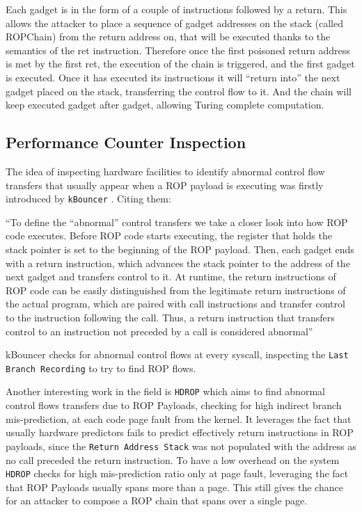 \documentclass[11pt]{article}
\begin{document}
Each gadget is in the form of a couple of instructions followed by a return. This allows the attacker to place a sequence of gadget addresses on the stack (called ROPChain) from the return address on, that will be executed thanks to the semantics of the ret instruction. Therefore once the first poisoned return address is met by the first ret, the execution of the chain is triggered, and the first gadget is executed. Once it has executed its instructions it will ``return into'' the next gadget placed on the stack, transferring the control flow to it. And the chain will keep executed gadget after gadget, allowing Turing complete computation.

\subsection{Performance Counter Inspection}
The idea of inspecting hardware facilities to identify abnormal control flow transfers that usually appear when a ROP payload is executing was firstly introduced by {\tt kBouncer} \cite{kbouncer}. Citing them:

``To define the “abnormal” control transfers we take a closer look into how ROP code executes. Before
ROP code starts executing, the register that holds the stack pointer is set to the beginning of the ROP
payload. Then, each gadget ends with a return instruction, which advances the stack pointer to the address
of the next gadget and transfers control to it. At runtime, the return instructions of ROP code can be
easily distinguished from the legitimate return instructions of the actual program, which are paired with
call instructions and transfer control to the instruction following the call. Thus, a return instruction that
transfers control to an instruction not preceded by a call is considered abnormal''

kBouncer checks for abnormal control flows at every syscall, inspecting the {\tt Last Branch Recording} to try to find ROP flows.

Another interesting work in the field is {\tt HDROP} \cite{HDROP} which aims to find abnormal control flows transfers due to ROP Payloads, checking for high indirect branch mis-prediction, at each code page fault from the kernel. It leverages the fact that usually hardware predictors fails to predict effectively return instructions in ROP payloads, since the {\tt Return Address Stack} was not populated with the address as no call preceded the return instruction. To have a low overhead on the system {\tt HDROP} checks for high mis-prediction ratio only at page fault, leveraging the fact that ROP Payloads usually spans more than a page. This still gives the chance for an attacker to compose a ROP chain that spans over a single page.
\end{document}
